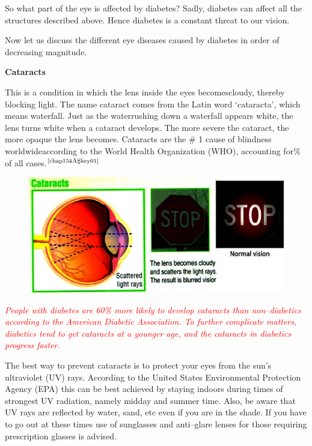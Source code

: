 So what part of the eye is affected by diabetes? Sadly, diabetes can affect all the structures described above. Hence diabetes is a constant threat to our vision.


Now let us discuss the different eye diseases caused by diabetes in order of decreasing magnitude.

\noindent\textbf{Cataracts}

This is a condition in which the lens inside the eyes becomes\break cloudy, thereby blocking light. The name cataract comes from the Latin word ‘cataracta’, which means waterfall. Just as the water\break rushing down a waterfall appears white, the lens turns white when a cataract deve\-lops. The more severe the cataract, the more opaque the lens becomes. Cataracts are the \# 1 cause of blindness worldwide\break according to the World Health Organization (WHO), accounting for\% of all cases.$^{\text{\cite{chap15–key01}}}$

\begin{figure}[h]
\centering
\includegraphics[scale=3.4]{images/050.jpg}
\end{figure}

\textcolor{red}{\textit{People with diabetes are 60\% more likely to develop cataracts than non–diabetics according to the American Diabetic Association. To further complicate matters, diabetics tend to get cataracts at a younger age, and the cataracts in diabetics progress faster.}}

The best way to prevent cataracts is to protect your eyes from the sun’s ultraviolet (UV) rays. According to the United States Environmental Protection Agency (EPA) this can be best achieved by staying indoors during times of strongest UV radiation, namely midday and summer time. Also, be aware that UV rays are reflected by water, sand, etc even if you are in the shade. If you have to go out at these times use of sunglasses and anti–glare lenses for those requiring prescription glasses is advised.

